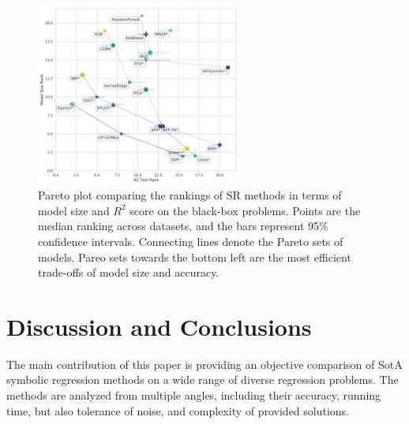 \begin{figure}
    \centering
    \includegraphics[width=0.6\textwidth]{figs/results_pmlb_r1/pareto_plot_r2_test_rank_model_size_rank.pdf}
    \caption{
        Pareto plot comparing the rankings of SR methods in terms of model size and $R^2$ score on the black-box problems.
        Points are the median ranking across datasets, and the bars represent 95\% confidence intervals. 
        Connecting lines denote the Pareto sets of models. 
        Pareo sets towards the bottom left are the most efficient trade-offs of model size and accuracy. 
    } \label{fig:pareto}
\end{figure}

\section{Discussion and Conclusions}

The main contribution of this paper is providing an objective comparison of SotA symbolic regression methods on a wide range of diverse regression problems.
The methods are analyzed from multiple angles, including their accuracy, running time, but also tolerance of noise, and complexity of provided solutions. 

